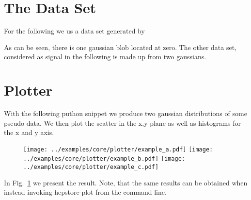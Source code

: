 
\section{The Data Set}
For the following we us a data set generated by 
%
\begin{changemargin}{1.5cm}{1.5cm} 
  
\end{changemargin}
%
As can be seen, there is one gaussian blob located at zero. The other
data set, considered as signal in the following is made up from two
gaussians.

\section{Plotter}
With the following puthon snippet we produce two gaussian
distributions of some pseudo data. We then plot the scatter in the x,y
plane as well as histograms for the x and y axis.
%
\begin{changemargin}{1.5cm}{1.5cm} 
  
\end{changemargin}
%
%
\begin{figure}
  \centering
  \texttt{[image: ../examples/core/plotter/example\_a.pdf]}
  \texttt{[image: ../examples/core/plotter/example\_b.pdf]}
  \texttt{[image: ../examples/core/plotter/example\_c.pdf]}
  \caption{}
  \label{fig:example_plotting}
\end{figure}
%
In Fig.~\ref{fig:example_plotting} we present the result. Note, that
the same results can be obtained when instead invoking hepstore-plot
from the command line.

